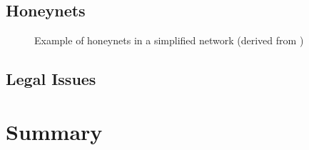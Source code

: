 \subsection{Honeynets}

\begin{figure}[h]
    \centering
    
    \caption{Example of honeynets in a simplified network (derived from \cite{Spitzner2003})}
    \label{fig:honeynet-example}
\end{figure}

\cite{Spitzner2003}

\subsection{Legal Issues}

\cite{Spitzner2003}

\section{Summary}

